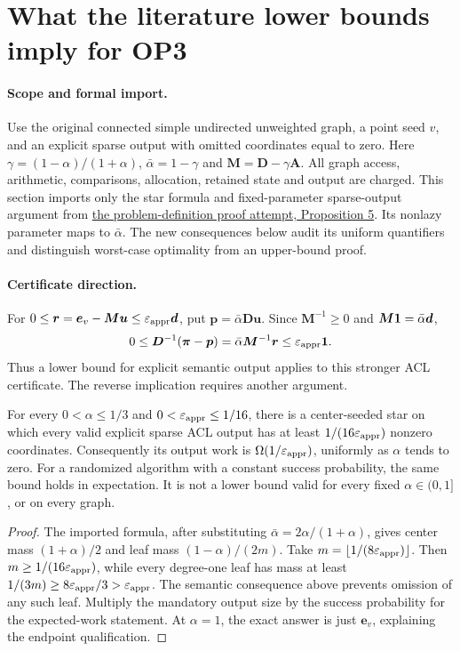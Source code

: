 \section[Lower-bound quantifiers]{What the literature lower bounds imply for OP3}
\label{sec:op3-lower-bound-quantifiers}

\paragraph{Scope and formal import.}
Use the original connected simple undirected unweighted graph, a point seed
$v$, and an explicit sparse output with omitted coordinates equal to zero.
Here $\gamma=(1-\alpha)/(1+\alpha)$, $\bar\alpha=1-\gamma$ and
$\bm M=\bm D-\gamma\bm A$. All graph access, arithmetic, comparisons,
allocation, retained state and output are charged. This section imports
only the star formula and fixed-parameter sparse-output argument from
\href{../problem_definitions/open_conjectures_proof_attempt.md}{the
problem-definition proof attempt, Proposition 5}. Its nonlazy parameter
maps to $\bar\alpha$. The new consequences below audit its uniform
quantifiers and distinguish worst-case optimality from an upper-bound proof.

\paragraph{Certificate direction.}
For $0\leq\bm r=\bm e_v-\bm M\bm u\leq\varepsilon_{\mathrm{appr}}\bm d$, put
$\bm p=\bar\alpha\bm D\bm u$. Since
$\bm M^{-1}\geq0$ and $\bm M\mathbf{1}=\bar\alpha\bm d$,
\[
 0\leq\bm D^{-1}(\bm\pi-\bm p)
 =\bar\alpha\bm M^{-1}\bm r\leq\varepsilon_{\mathrm{appr}}\mathbf{1}.
\]
Thus a lower bound for explicit semantic output applies to this stronger
ACL certificate. The reverse implication requires another argument.

\begin{corollary}
\label{cor:op3-uniform-output-lower-bound}
For every $0<\alpha\leq1/3$ and $0<\varepsilon_{\mathrm{appr}}\leq1/16$, there is a
center-seeded star on which every valid explicit sparse ACL output has
at least $1/(16\varepsilon_{\mathrm{appr}})$ nonzero coordinates. Consequently its output
work is $\Omega(1/\varepsilon_{\mathrm{appr}})$, uniformly as $\alpha$ tends to zero.
For a randomized algorithm with a constant success probability, the same
bound holds in expectation. It is not a lower bound valid for every
fixed $\alpha\in(0,1]$, or on every graph.
\end{corollary}
\begin{proof}
The imported formula, after substituting $\bar\alpha=2\alpha/(1+\alpha)$,
gives center mass $(1+\alpha)/2$ and leaf mass $(1-\alpha)/(2m)$.
Take $m=\lfloor1/(8\varepsilon_{\mathrm{appr}})\rfloor$. Then
$m\geq1/(16\varepsilon_{\mathrm{appr}})$, while every degree-one leaf has mass
at least $1/(3m)\geq8\varepsilon_{\mathrm{appr}}/3>\varepsilon_{\mathrm{appr}}$.
The semantic consequence above prevents omission of any such leaf.
Multiply the mandatory output size by the success probability for the
expected-work statement. At $\alpha=1$, the exact answer is just
$\bm e_v$, explaining the endpoint qualification.
\end{proof}

